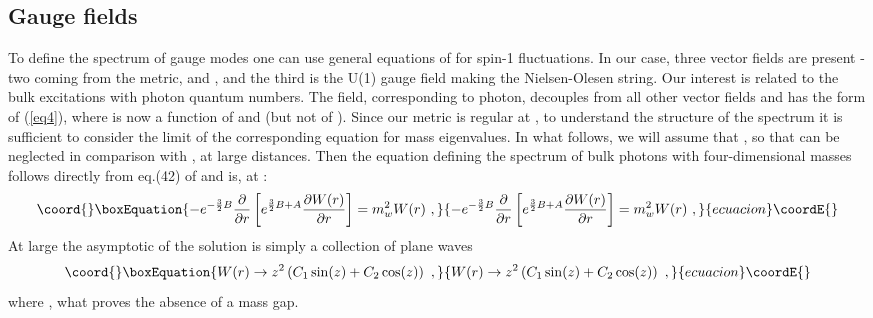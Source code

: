 \documentclass[a4paper,12pt]{article}
\begin{document}
\subsection{Gauge fields}
To define the spectrum of gauge modes one can use general equations 
of \cite{Randjbar-Daemi:2002pq} for spin-1 fluctuations. In our case,
three vector fields are present - two coming from the metric,
\coordHE{} and \coordHE{}, and the third is the U(1) gauge
field making the Nielsen-Olesen string. Our interest is related to the bulk
excitations with photon quantum numbers.  The field, corresponding to
photon, decouples from all other vector fields and has the form of
(\ref{eq4}), where \coordHE{} is now a function of \coordHE{} and \coordHE{} (but
not of \myHighlight{$\theta$}\coordHE{}). Since our metric is regular at \coordHE{}, to
understand the structure of the spectrum it is sufficient to consider
the \coordHE{} limit of the corresponding equation for mass
eigenvalues.  In what follows, we will assume that \coordHE{}, so that
\coordHE{} can be neglected in comparison with \coordHE{}, \coordHE{} at large
distances. Then the equation defining the spectrum of bulk photons with
four-dimensional masses \coordHE{} follows directly from eq.(42) of 
\cite{Randjbar-Daemi:2002pq} and is, at \coordHE{}:
\begin{equation}\coord{}\boxEquation{
-e^{-\frac{3}{2}B}\frac{\partial}{\partial r}
\left[e^{\frac{3}{2}B+A}\frac{\partial
W(r)}{\partial r}\right] = m_w^2 W(r)~,
}{
-e^{-\frac{3}{2}B}\frac{\partial}{\partial r}
\left[e^{\frac{3}{2}B+A}\frac{\partial
W(r)}{\partial r}\right] = m_w^2 W(r)~,
}{ecuacion}\coordE{}\end{equation}
At large \coordHE{} the asymptotic of the solution is simply a collection of
plane waves
\begin{equation}\coord{}\boxEquation{
W(r) \to z^2 \left(C_1 \sin(z) + C_2 \cos(z)\right)~,
}{
W(r) \to z^2 \left(C_1 \sin(z) + C_2 \cos(z)\right)~,
}{ecuacion}\coordE{}\end{equation}
where \coordHE{}, what proves the absence of a mass gap.
\end{document}
